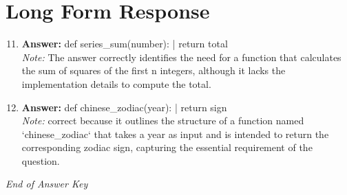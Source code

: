 \documentclass[12pt]{article}
\begin{document}
\section*{Long Form Response}
\begin{enumerate}[label=\arabic*.]
\setcounter{enumi}{10}
\item \textbf{Answer:} def series\_sum(number): | return total
\\ \textit{Note:} The answer correctly identifies the need for a function that calculates the sum of squares of the first n integers, although it lacks the implementation details to compute the total.
\item \textbf{Answer:} def chinese\_zodiac(year): | return sign
\\ \textit{Note:} correct because it outlines the structure of a function named `chinese\_zodiac` that takes a year as input and is intended to return the corresponding zodiac sign, capturing the essential requirement of the question.
\end{enumerate}

\vfill
\noindent\textit{End of Answer Key}
\end{document}
